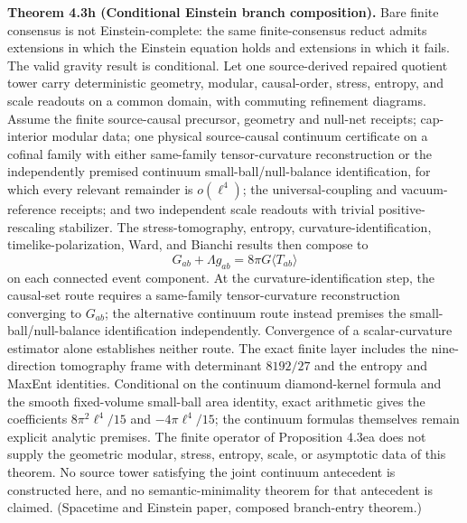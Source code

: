 \textbf{Theorem 4.3h (Conditional Einstein branch composition).} Bare finite consensus is not Einstein-complete: the same finite-consensus reduct admits extensions in which the Einstein equation holds and extensions in which it fails. The valid gravity result is conditional. Let one source-derived repaired quotient tower carry deterministic geometry, modular, causal-order, stress, entropy, and scale readouts on a common domain, with commuting refinement diagrams. Assume the finite source-causal precursor, geometry and null-net receipts; cap-interior modular data; one physical source-causal continuum certificate on a cofinal family with either same-family tensor-curvature reconstruction or the independently premised continuum small-ball/null-balance identification, for which every relevant remainder is \(o(\ell^4)\); the universal-coupling and vacuum-reference receipts; and two independent scale readouts with trivial positive-rescaling stabilizer. The stress-tomography, entropy, curvature-identification, timelike-polarization, Ward, and Bianchi results then compose to
\[
G_{ab}+\Lambda g_{ab}=8\pi G\langle T_{ab}\rangle
\]
on each connected event component. At the curvature-identification step, the
causal-set route requires a same-family tensor-curvature reconstruction
converging to \(G_{ab}\); the alternative continuum route instead premises the
small-ball/null-balance identification independently. Convergence of a
scalar-curvature estimator alone establishes neither route. The exact finite layer includes the nine-direction tomography frame with determinant \(8192/27\) and the entropy and MaxEnt identities. Conditional on the continuum diamond-kernel formula and the smooth fixed-volume small-ball area identity, exact arithmetic gives the coefficients \(8\pi^2\ell^4/15\) and \(-4\pi\ell^4/15\); the continuum formulas themselves remain explicit analytic premises. The finite operator of Proposition 4.3ea does not supply the geometric modular, stress, entropy, scale, or asymptotic data of this theorem. No source tower satisfying the joint continuum antecedent is constructed here, and no semantic-minimality theorem for that antecedent is claimed. (Spacetime and Einstein paper, composed branch-entry theorem.)

